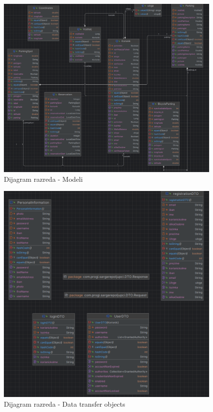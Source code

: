 	
\begin{figure}[H]
	\includegraphics[width=\textwidth]{slike/models.png} %
	\centering
	\caption{Dijagram razreda - Modeli}
\end{figure}

\begin{figure}[H]
	\includegraphics[width=\textwidth]{slike/dto.png} %
	\centering
	\caption{Dijagram razreda - Data transfer objects}
	\label{fig:dijagramrazreda2}
\end{figure}




